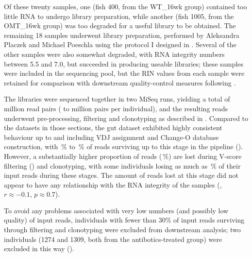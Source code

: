 Of these twenty samples, one (fish 400, from the WT\_16wk group) contained too little RNA to undergo \igseq library preparation, while another (fish 1005, from the OMT\_16wk group) was too degraded for a useful library to be obtained. The remaining 18 samples underwent \igseq library preparation, performed by Aleksandra Placzek and Michael Poeschla using the protocol I designed in . Several of the other samples were also somewhat degraded, with RNA integrity numbers between 5.5 and 7.0, but succeeded in producing useable libraries; these samples were included in the sequencing pool, but the RIN values from each sample were retained for comparison with downstream quality-control measures following \Igseq.

The libraries were sequenced together in two MiSeq runs, yielding a total of  million read pairs ( to  million pairs per individual), and the resulting reads underwent pre-processing, filtering and clonotyping as described in . Compared to the datasets in those sections, the gut dataset exhibited highly consistent behaviour up to and including VDJ assignment and Change-O database construction, with \,\% to \,\% of reads surviving up to this stage in the pipeline (). However, a substantially higher proportion of reads (\,\%) are lost during V-score filtering () and clonotyping, with some individuals losing as much as \,\% of their input reads during these stages. The amount of reads lost at this stage did not appear to have any relationship with the RNA integrity of the samples (, $r \approx -0.1$, $p \approx 0.7$).

To avoid any problems associated with very low numbers (and possibly low quality) of input reads, individuals with fewer than 30\% of input reads surviving through filtering and clonotyping were excluded from downstream analysis; two individuals (1274 and 1309, both from the antibotics-treated group) were excluded in this way ().

